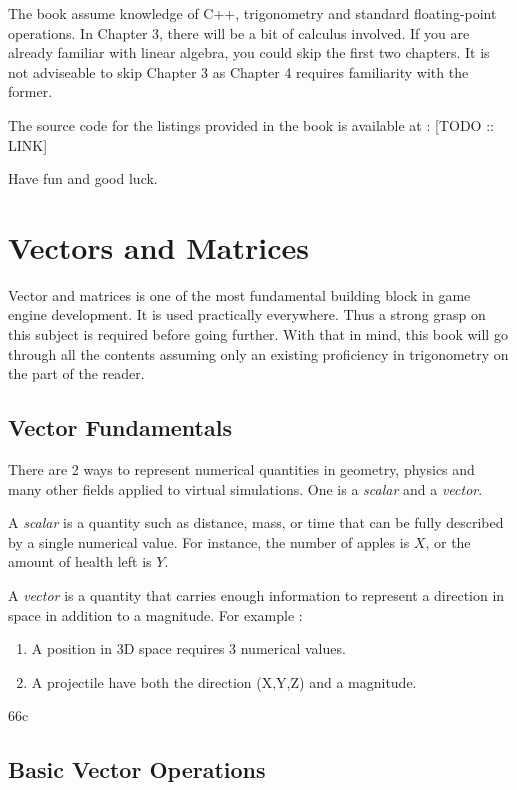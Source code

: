 \documentclass[a4paper,10pt]{article}
\begin{document}
The book assume knowledge of C++, trigonometry and standard floating-point operations.
In Chapter 3, there will be a bit of calculus involved.
If you are already familiar with linear algebra, you could skip the first two chapters.
It is not adviseable to skip Chapter 3 as Chapter 4 requires familiarity with the former.

The source code for the listings provided in the book is available at : [TODO :: LINK]

Have fun and good luck.

\section{Vectors and Matrices}

Vector and matrices is one of the most fundamental building block in game engine development.
It is used practically everywhere.
Thus a strong grasp on this subject is required before going further.
With that in mind, this book will go through all the contents assuming only an existing proficiency in trigonometry on the part of the reader.

\subsection{Vector Fundamentals}

There are 2 ways to represent numerical quantities in geometry, physics and many other fields applied to virtual simulations.
One is a \textit{scalar} and a \textit{vector}.

A \textit{scalar} is a quantity such as distance, mass, or time that can be fully described by a single numerical value.
For instance, the number of apples is $X$, or the amount of health left is $Y$.

A \textit{vector} is a quantity that carries enough information to represent a direction in space in addition to a magnitude.
For example :

\begin{enumerate}
    \item
          A position in 3D space requires 3 numerical values.
    \item
          A projectile have both the direction (X,Y,Z) and a magnitude.
\end{enumerate}

66c\subsection{Basic Vector Operations}
\end{document}
